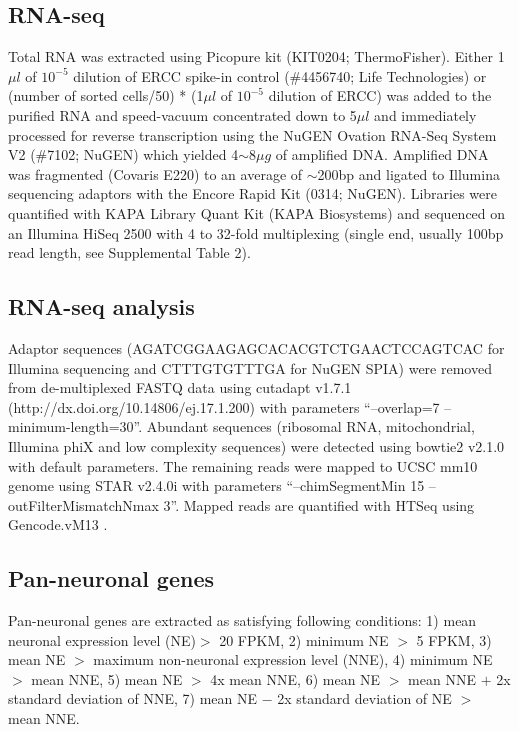 \subsection{RNA-seq}
Total RNA was extracted using Picopure kit (KIT0204; ThermoFisher). Either 1$\mu l$ of $10^{-5}$ dilution of ERCC spike-in control (\#4456740; Life Technologies) or (number of sorted cells/50) * (1$\mu l$ of $10^{-5}$ dilution of ERCC) was added to the purified RNA and speed-vacuum concentrated down to 5$\mu l$ and immediately processed for reverse transcription using the NuGEN Ovation RNA-Seq System V2 (\#7102; NuGEN) which yielded 4$\sim$8$\mu g$ of amplified DNA. Amplified DNA was fragmented (Covaris E220) to an average of $\sim$200bp and ligated to Illumina sequencing adaptors with the Encore Rapid Kit (0314; NuGEN). Libraries were quantified with KAPA Library Quant Kit (KAPA Biosystems) and sequenced on an Illumina HiSeq 2500 with 4 to 32-fold multiplexing (single end, usually 100bp read length, see Supplemental Table 2).

\subsection{RNA-seq analysis}
Adaptor sequences (AGATCGGAAGAGCACACGTCTGAACTCCAGTCAC for Illumina sequencing and CTTTGTGTTTGA for NuGEN SPIA) were removed from de-multiplexed FASTQ data using cutadapt v1.7.1 (http://dx.doi.org/10.14806/ej.17.1.200) with parameters “--overlap=7 --minimum-length=30”. Abundant sequences (ribosomal RNA, mitochondrial, Illumina phiX and low complexity sequences) were detected using bowtie2 \citep{Langmead_2012} v2.1.0 with default parameters. The remaining reads were mapped to UCSC mm10 genome using STAR \citep{Dobin_2012} v2.4.0i with parameters “--chimSegmentMin 15 --outFilterMismatchNmax 3”. Mapped reads are quantified with HTSeq \citep{Anders_2014} using Gencode.vM13 \citep{Harrow_2012}.

\subsection{Pan-neuronal genes}
Pan-neuronal genes are extracted as satisfying following conditions: 1) mean neuronal expression level (NE)$>$ 20 FPKM, 2) minimum NE $>$ 5 FPKM, 3) mean NE $>$ maximum non-neuronal expression level (NNE), 4) minimum NE $>$ mean NNE, 5) mean NE $>$ 4x mean NNE, 6) mean NE $>$ mean NNE $+$ 2x standard deviation of NNE, 7) mean NE $-$ 2x standard deviation of NE $>$ mean NNE. 

